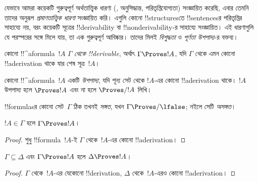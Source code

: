 \documentclass[../../../include/open-logic-section]{subfiles}
\begin{document}
      {}
      {}


\begin{explain}
যেভাবে আমরা কয়েকটি গুরুত্বপূর্ণ অর্থতাত্ত্বিক ধারণা
(, অনুসিদ্ধান্ত, পরিতৃপ্তিযোগ্যতা)
সংজ্ঞায়িত করেছি, এবার তেমনি তাদের অনুরূপ \emph{প্রমাণতাত্ত্বিক
ধারণা} সংজ্ঞায়িত করি। এগুলি কোনো !!{structure}sতে !!{sentence}sর
পরিতৃপ্তির সাহায্যে নয়, বরং কয়েকটি সূত্রের !!{derivability} বা
!!{nonderivability}-র সাহায্যে সংজ্ঞায়িত। এই ধারণাগুলি যে পরস্পরের
সঙ্গে মিলে যায়, তা এক গুরুত্বপূর্ণ আবিষ্কার। তাদের মিলই
\emph{বিশুদ্ধতা} ও \emph{পূর্ণতা উপপাদ্য}-র বক্তব্য।
\end{explain}

\begin{defn}[!!^{derivability}]
কোনো !!^a{formula}~$!A$ $\Gamma$ \emph{থেকে !!{derivable}}, অর্থাৎ
$\Gamma \Proves !A$, যদি $\Gamma$ থেকে এমন কোনো !!a{derivation}
থাকে যার শেষ সূত্র~$!A$।
\end{defn}

\begin{defn}[উপপাদ্য]
কোনো !!^a{formula}~$!A$ একটি \emph{উপপাদ্য}, যদি শূন্য সেট থেকে
$!A$-এর কোনো !!a{derivation} থাকে। $!A$ উপপাদ্য হলে $\Proves !A$
এবং না হলে $\Proves/ !A$ লিখি।
\end{defn}

\begin{defn}[সঙ্গতি]
!!{formula}sর কোনো সেট~$\Gamma$ ঠিক তখনই \emph{সঙ্গত}, যখন
$\Gamma\Proves/ \lfalse$; নইলে সেটি \emph{অসঙ্গত}।
\end{defn}

\begin{prop}[প্রতিবিম্ব ধর্ম]
$!A \in \Gamma$ হলে $\Gamma \Proves !A$।
\end{prop}

\begin{proof}
  শুধু !!{formula}~$!A$-ই $\Gamma$ থেকে~$!A$-এর কোনো !!a{derivation}।
\end{proof}

\begin{prop}[একঘেয়েতা]
$\Gamma \subseteq \Delta$ এবং $\Gamma \Proves !A$ হলে $\Delta
\Proves !A$।
\end{prop}

\begin{proof}
$\Gamma$ থেকে~$!A$-এর যেকোনো !!{derivation}, $\Delta$
থেকে~$!A$-এরও কোনো !!a{derivation}।
\end{proof}
\end{document}

